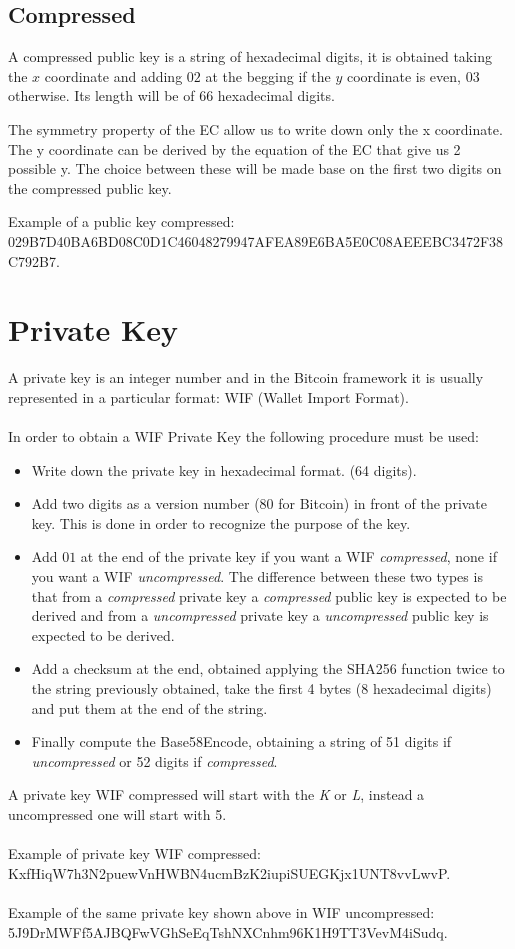\subsection{Compressed}
A compressed public key is a string of hexadecimal digits, it is obtained taking the $x$ coordinate and adding $02$ at the begging if the $y$ coordinate is even, $03$ otherwise. Its length will be of $66$ hexadecimal digits.

\begin{remark}
	The symmetry property of the EC allow us to write down only the x coordinate. The y coordinate can be derived by the equation of the EC that give us 2 possible y. The choice between these will be made base on the first two digits on the compressed public key.
\end{remark}
Example of a public key compressed:\\
029B7D40BA6BD08C0D1C46048279947AFEA89E6BA5E0C08AEEEBC3472F38C792B7.


\section{Private Key}
A private key is an integer number and in the Bitcoin framework it is usually represented in a particular format: WIF (Wallet Import Format). 
\\ \\
In order to obtain a WIF Private Key the following procedure must be used:
\begin{itemize}
	\item Write down the private key in hexadecimal format. (64 digits).
	\item Add two digits as a version number ($80$ for Bitcoin) in front of the private key. This is done in order to recognize the purpose of the key.
	\item Add $01$ at the end of the private key if you want a WIF \textit{compressed}, none if you want a WIF \textit{uncompressed}. The difference between these two types is that from a \textit{compressed} private key a \textit{compressed} public key is expected to be derived and from a \textit{uncompressed} private key a \textit{uncompressed} public key is expected to be derived.
	\item Add a checksum at the end, obtained applying the SHA256 function twice to the string previously obtained, take the first 4 bytes (8 hexadecimal digits) and put them at the end of the string.
	\item Finally compute the Base58Encode, obtaining a string of 51 digits if \textit{uncompressed} or 52 digits if \textit{compressed}.
\end{itemize}
A private key WIF compressed will start with the \textit{K} or \textit{L}, instead a uncompressed one will start with 5.
\\ \\
Example of private key WIF compressed: \\ KxfHiqW7h3N2puewVnHWBN4ucmBzK2iupiSUEGKjx1UNT8vvLwvP.
\\ \\
Example of the same private key shown above in WIF uncompressed: \\ 5J9DrMWFf5AJBQFwVGhSeEqTshNXCnhm96K1H9TT3VevM4iSudq.

